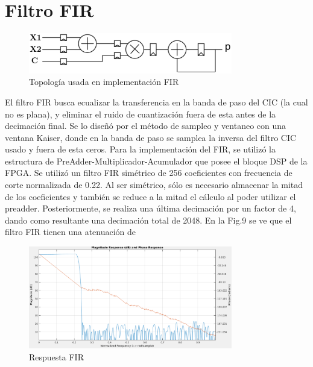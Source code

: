 \documentclass[a4paper,conference]{IEEEtran}
\begin{document}
\section{Filtro FIR}

\begin{figure}[!b]
\centering
\includegraphics[width=3.5in]{FIR_Topologia}
\caption{Topolog\'ia usada en implementaci\'on FIR}
\label{fig_9}
\end{figure}

El filtro FIR busca ecualizar la transferencia en la banda de paso del CIC (la cual no es plana), y eliminar el ruido de cuantizaci\'on fuera de esta antes de la decimaci\'on final. Se lo dise\~n\'o por el m\'etodo de sampleo y ventaneo con una ventana Kaiser, donde en la banda de paso se samplea la inversa del filtro CIC usado y fuera de esta ceros. 
Para la implementación del FIR, se utiliz\'o la estructura de PreAdder-Multiplicador-Acumulador que posee el bloque DSP de la FPGA. Se utiliz\'o un filtro FIR sim\'etrico de 256 coeficientes  con frecuencia de corte normalizada de 0.22. Al ser sim\'etrico, s\'olo es necesario almacenar la mitad de los coeficientes y tambi\'en se reduce a la mitad el c\'alculo al poder utilizar el preadder.  Posteriormente, se realiza una \'ultima decimaci\'on por un factor de 4, dando como resultante una decimaci\'on total de 2048.
En la Fig.9 se ve que el filtro FIR tienen una atenuaci\'on de


\begin{figure}[!t]
\centering
\includegraphics[width=3.5in]{Respuesta_FIR}
\caption{Respuesta FIR}
\label{fig_10}
\end{figure}
\end{document}
